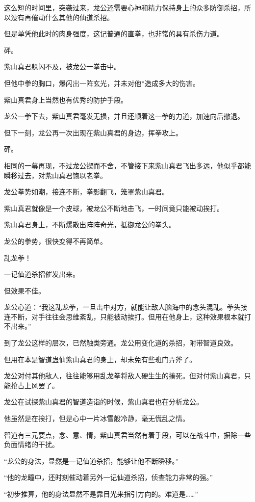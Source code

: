 \begin{this_body}
这么短的时间里，突袭过来，龙公还需要心神和精力保持身上的众多防御杀招，所以没有再催动什么其他的仙道杀招。

但是单凭他此时的肉身强度，这记普通的直拳，也非常的具有杀伤力道。

砰。

紫山真君躲闪不及，被龙公一拳击中。

但他中拳的胸口，爆闪出一阵玄光，并未对他*造成多大的伤害。

紫山真君身上当然也有优秀的防护手段。

龙公一拳下去，紫山真君毫发无损，并且还顺着这一拳的力道，加速向后撤退。

但下一刻，龙公再一次出现在紫山真君的身边，挥拳攻上。

砰。

相同的一幕再现，不过龙公锲而不舍，不管接下来紫山真君飞出多远，他似乎都能瞬移过去，对紫山真君饱以老拳。

龙公拳势如潮，接连不断，拳影翻飞，笼罩紫山真君。

紫山真君就像是一个皮球，被龙公不断地击飞，一时间竟只能被动挨打。

紫山真君身上，不断爆散出阵阵奇光，抵御龙公的拳头。

龙公的拳势，很快变得不再简单。

乱龙拳！

一记仙道杀招催发出来。

但效果不佳。

龙公心道：“我这乱龙拳，一旦击中对方，就能让敌人脑海中的念头混乱。拳头接连不断，对手往往会思维紊乱，只能被动挨打。但用在他身上，这种效果根本就打不出来。”

到了龙公这样的层次，已然触类旁通。龙公用变化道的杀招，附带智道良效。

但用在本是智道蛊仙紫山真君的身上，却未免有些班门弄斧了。

龙公对付其他敌人，往往能够用乱龙拳将敌人硬生生的揍死。但对付紫山真君，只能抢占上风罢了。

龙公在试探紫山真君的智道造诣的时候，紫山真君也在分析龙公。

他虽然是在挨打，但是心中一片冰雪般冷静，毫无慌乱之情。

智道有三元要点，念、意、情，紫山真君当然有着手段，可以在战斗中，摒除一些负面情绪的干扰。

“龙公的身法，显然是一记仙道杀招，能够让他不断瞬移。”

“他的龙瞳中，还时刻催动着另外一记仙道杀招，侦查能力非常的强。”

“初步推算，他的身法显然不是靠目光来指引方向的。难道是……”

\end{this_body}

